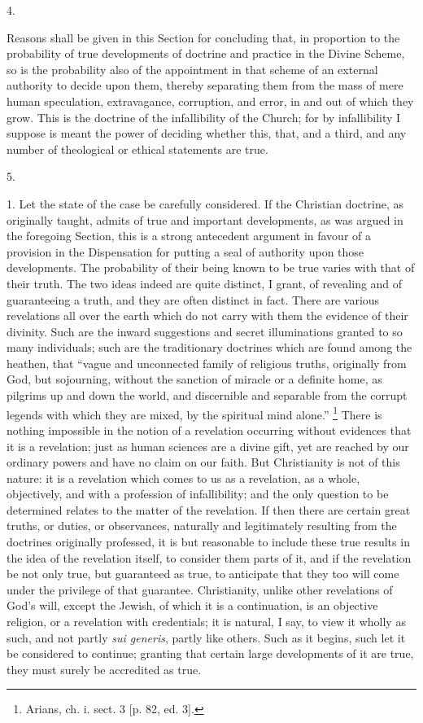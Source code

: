 4.

Reasons shall be given in this Section for concluding
that, in proportion to the probability of true
developments of doctrine and practice in the Divine
Scheme, so is the probability also of the appointment in
that scheme of an external authority to decide upon them,
thereby separating them from the mass of mere human
speculation, extravagance, corruption, and error, in and
out of which they grow. This is the doctrine of the
infallibility of the Church; for by infallibility I
suppose is meant the power of deciding whether this,
that, and a third, and any number of theological or
ethical statements are true.

5.

1. Let the state of the case be carefully considered.
If the Christian doctrine, as originally taught, admits
of true and important developments, as was argued in the
foregoing Section, this is a strong antecedent argument
in favour of a provision in the Dispensation for putting
a seal of authority upon those developments. The
probability of their being known to be true varies with
that of their truth. The two ideas indeed are quite
distinct, I grant, of revealing and of guaranteeing a
truth, and they are often distinct in fact. There are
various revelations all over the earth which do not carry
with them the evidence of their divinity. Such are the
inward suggestions and secret illuminations granted to so
many individuals; such are the traditionary doctrines
which are found among the heathen, that ``vague and
unconnected family of religious truths, originally from
God, but sojourning, without the sanction of miracle or a
definite home, as pilgrims up and down the world, and
discernible and separable from the corrupt legends with
which they are mixed, by the spiritual mind alone.''
\footnote{Arians, ch. i. sect. 3 [p. 82,
ed. 3].}
There is nothing impossible in the notion of a revelation
occurring without evidences that it is a revelation; just
as human sciences are a divine gift, yet are reached by
our ordinary powers and have no claim on our faith. But
Christianity is not of this nature: it is a revelation
which comes to us as a revelation, as a whole,
objectively, and with a profession of infallibility; and
the only question to be determined relates to the matter
of the revelation. If then there are certain great
truths, or duties, or observances, naturally and
legitimately resulting from the doctrines originally
professed, it is but reasonable to include these true
results in the idea of the revelation itself, to consider
them parts of it, and if the revelation be not only true,
but guaranteed as true, to anticipate that they too will
come under the privilege of that guarantee. Christianity,
unlike other revelations of God's will, except the
Jewish, of which it is a continuation, is an objective
religion, or a revelation with credentials; it is
natural, I say, to view it wholly as such, and not partly
\emph{sui generis}, partly like others. Such as it
begins, such let it be considered to continue; granting
that certain large developments of it are true, they must
surely be accredited as true.

